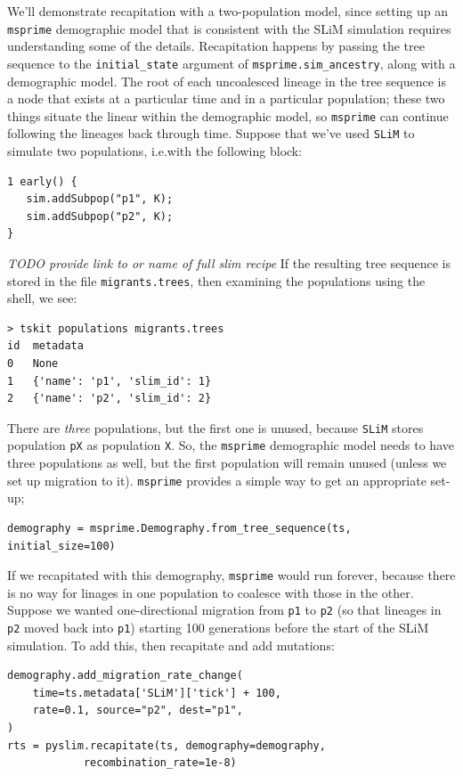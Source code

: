 \documentclass[12pt]{article}
\newcommand{\msprime}[0]{\texttt{msprime}\xspace}
\newcommand{\slim}[0]{\texttt{SLiM}\xspace}
\newcommand*{\ie}{i.e.\xcomma}
\newcommand{\comment}[1]{\textit{\color{green} #1}}
\newcommand{\p}[1]{\texttt{p#1}}
\begin{document}
We'll demonstrate recapitation with a two-population model,
since setting up an \msprime demographic model that is consistent with the SLiM simulation
requires understanding some of the details.
Recapitation happens by passing the tree sequence to the
\texttt{initial\_state} argument of \texttt{msprime.sim\_ancestry},
along with a demographic model.
The root of each uncoalesced lineage in the tree sequence is a node
that exists at a particular time and in a particular population;
these two things situate the linear within the demographic model,
so \msprime can continue following the lineages back through time.
Suppose that we've used \slim to simulate two populations, \ie with the following block:
\begin{verbatim}
1 early() {
   sim.addSubpop("p1", K);
   sim.addSubpop("p2", K);
}
\end{verbatim}
\comment{TODO provide link to or name of full slim recipe}
If the resulting tree sequence is stored in the file \texttt{migrants.trees},
then examining the populations using the shell, we see:
\begin{verbatim}
> tskit populations migrants.trees
id	metadata
0	None
1	{'name': 'p1', 'slim_id': 1}
2	{'name': 'p2', 'slim_id': 2}
\end{verbatim}
There are \emph{three} populations, but the first one is unused,
because \slim stores population \texttt{pX} as population \texttt{X}.
So, the \msprime demographic model needs to have three populations as well,
but the first population will remain unused (unless we set up migration to it).
\msprime provides a simple way to get an appropriate set-up;
\begin{verbatim}
demography = msprime.Demography.from_tree_sequence(ts, initial_size=100)
\end{verbatim}
If we recapitated with this demography,
\msprime would run forever,
because there is no way for linages in one population
to coalesce with those in the other.
Suppose we wanted one-directional migration from \p1 to \p2
(so that lineages in \p2 moved back into \p1)
starting 100 generations before the start of the SLiM simulation.
To add this, then recapitate and add mutations:
\begin{verbatim}
demography.add_migration_rate_change(
    time=ts.metadata['SLiM']['tick'] + 100,
    rate=0.1, source="p2", dest="p1",
)
rts = pyslim.recapitate(ts, demography=demography,
            recombination_rate=1e-8)
\end{verbatim}
\end{document}
